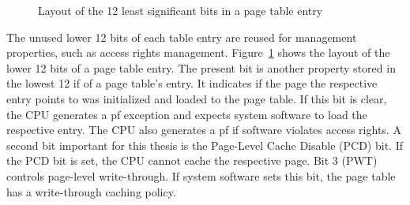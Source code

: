 \begin{figure}
  \begin{center}
    
    \caption{Layout of the 12 least significant bits in a page table entry}
    \label{fig:state:technical:paging_rights}
  \end{center}
\end{figure}
The unused lower 12 bits of each table entry are reused for management
properties, such as access rights management.
Figure~\ref{fig:state:technical:paging_rights} shows the layout of the lower 12
bits of a page table entry. The present bit is another property stored in the
lowest 12 if of a page table's entry. It indicates if the page the respective
entry points to was initialized and loaded to the page table. If this bit is
clear, the CPU generates a \gls{pf} exception and expects system software to
load the respective entry. The CPU also generates a \gls{pf} if software
violates access rights. A second bit important for this thesis is the Page-Level
Cache Disable (PCD) bit. If the PCD bit is set, the CPU cannot cache the
respective page. Bit 3 (PWT) controls page-level write-through. If system
software sets this bit, the page table has a write-through caching policy.
